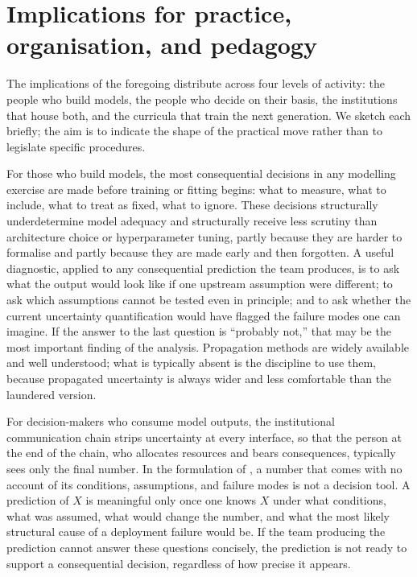 \documentclass[11pt,a4paper]{article}
\begin{document}
\section{Implications for practice, organisation, and pedagogy}
\label{sec:discussion}

The implications of the foregoing distribute across four levels of
activity: the people who build models, the people who decide on their
basis, the institutions that house both, and the curricula that train
the next generation. We sketch each briefly; the aim is to indicate the
shape of the practical move rather than to legislate specific
procedures.

For those who build models, the most consequential decisions in any
modelling exercise are made before training or fitting begins: what to
measure, what to include, what to treat as fixed, what to ignore. These
decisions structurally underdetermine model adequacy and structurally
receive less scrutiny than architecture choice or hyperparameter tuning,
partly because they are harder to formalise and partly because they are
made early and then forgotten. A useful diagnostic, applied to any
consequential prediction the team produces, is to ask what the output
would look like if one upstream assumption were different; to ask which
assumptions cannot be tested even in principle; and to ask whether the
current uncertainty quantification would have flagged the failure modes
one can imagine. If the answer to the last question is ``probably
not,'' that may be the most important finding of the analysis.
Propagation methods are widely available and well understood; what is
typically absent is the discipline to use them, because propagated
uncertainty is always wider and less comfortable than the laundered
version.

For decision-makers who consume model outputs, the institutional
communication chain strips uncertainty at every interface, so that the
person at the end of the chain, who allocates resources and bears
consequences, typically sees only the final number. In the formulation
of \citet{Spiegelhalter2019}, a number that comes with no account of its
conditions, assumptions, and failure modes is not a decision tool. A
prediction of $X$ is meaningful only once one knows $X$ under what
conditions, what was assumed, what would change the number, and what
the most likely structural cause of a deployment failure would be. If
the team producing the prediction cannot answer these questions
concisely, the prediction is not ready to support a consequential
decision, regardless of how precise it appears.
\end{document}
